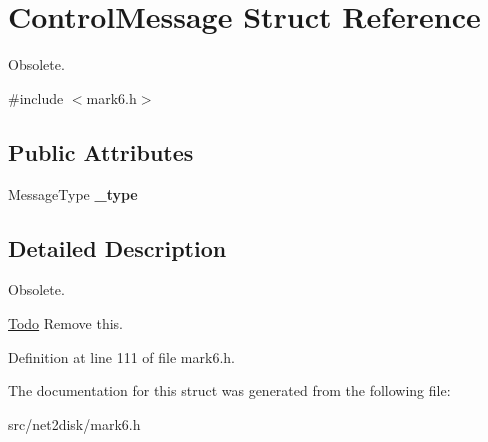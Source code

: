 \hypertarget{struct_control_message}{
\section{ControlMessage Struct Reference}
\label{struct_control_message}
}


Obsolete.  




{\ttfamily \#include $<$mark6.h$>$}

\subsection*{Public Attributes}
\begin{DoxyCompactItemize}
\item 
\hypertarget{struct_control_message_a317f02c4f2d241de0779f903d54855e9}{
MessageType {\bfseries \_\-type}}
\label{struct_control_message_a317f02c4f2d241de0779f903d54855e9}

\end{DoxyCompactItemize}


\subsection{Detailed Description}
Obsolete. 

\begin{Desc}
\item[\hyperlink{todo__todo000005}{Todo}]Remove this. \end{Desc}


Definition at line 111 of file mark6.h.



The documentation for this struct was generated from the following file:\begin{DoxyCompactItemize}
\item 
src/net2disk/mark6.h\end{DoxyCompactItemize}

